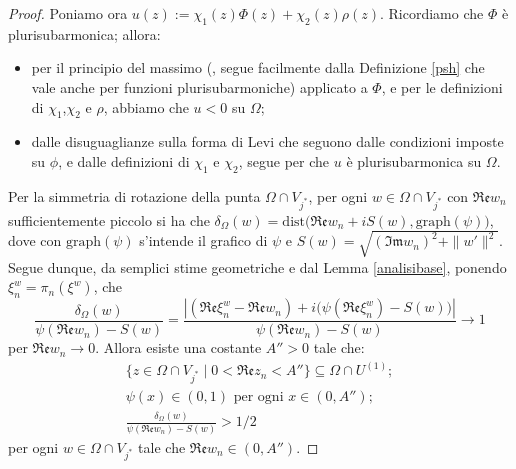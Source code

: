 \begin{proof}
    Poniamo ora $u(z):=\chi_1(z)\Phi(z)+\chi_2(z)\rho(z)$. Ricordiamo che $\Phi$ è plurisubarmonica; allora:
    \begin{itemize}
        \item per il principio del massimo (\cite[Corollary 2.1.5]{Kr}, segue facilmente dalla Definizione \ref{psh} che vale anche per funzioni plurisubarmoniche) applicato a $\Phi$, e per le definizioni di $\chi_1$,$\chi_2$ e $\rho$, abbiamo che $u<0$ su $\Omega$;
        \item dalle disuguaglianze sulla forma di Levi che seguono dalle condizioni imposte su $\phi$, e dalle definizioni di $\chi_1$ e $\chi_2$, segue per \cite[Theorem 2.6.2]{H} che $u$ è plurisubarmonica su $\Omega$.
    \end{itemize}

    Per la simmetria di rotazione della punta $\Omega\cap V_{j^*}$, per ogni $w\in\Omega\cap V_{j^*}$ con $\mathfrak{Re}w_n$ sufficientemente piccolo si ha che $\delta_\Omega(w)=\text{dist}\big(\mathfrak{Re}w_n+iS(w),\text{graph}(\psi)\big)$, dove con $\text{graph}(\psi)$ s'intende il grafico di $\psi$ e $S(w)=\sqrt{(\mathfrak{Im}w_n)^2+\|w'\|^2}$. Segue dunque, da semplici stime geometriche e dal Lemma \ref{analisibase}, ponendo $\xi^w_n=\pi_n(\xi^w)$, che
    \begin{equation}\label{limite_brutto}
        \frac{\delta_\Omega(w)}{\psi(\mathfrak{Re}w_n)-S(w)}=\frac{\left|(\mathfrak{Re}\xi^w_n-\mathfrak{Re}w_n)+i\big(\psi(\mathfrak{Re}\xi^w_n)-S(w)\big)\right|}{\psi(\mathfrak{Re}w_n)-S(w)}\longrightarrow 1
    \end{equation}
    per $\mathfrak{Re}w_n\longrightarrow 0$. Allora esiste una costante $A''>0$ tale che:
    \begin{gather}
        \{z\in\Omega\cap V_{j^*}\mid0<\mathfrak{Re}z_n<A''\}\subseteq\Omega\cap U^{(1)};\label{7punto4}\\
        \psi(x)\in(0,1)\text{ per ogni }x\in(0,A'');\label{7punto4due}\\
        \frac{\delta_\Omega(w)}{\psi(\mathfrak{Re}w_n)-S(w)}>1/2\label{7punto5}
    \end{gather}
    per ogni $w\in\Omega\cap V_{j^*}$ tale che $\mathfrak{Re}w_n\in(0,A'')$.


\end{proof}
